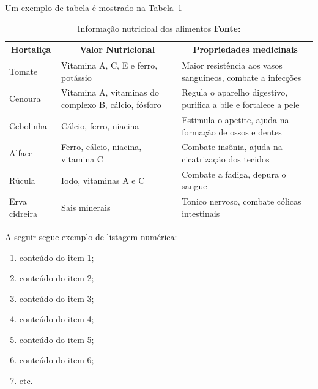 \par Um exemplo de tabela é mostrado na Tabela~\ref{tab:informativa}


\begin{table} [h]
  \caption[Informação nutricioal dos alimentos]
          {Informação nutricioal dos alimentos \textbf{Fonte:} \cite{correa2003plantas}}
  \centering
  \begin{tabular}{|p{0.7in}|p{2in}|p{3in}|}
    \hline 
    \multicolumn{1}{|c|}{\textbf{Hortaliça}} & \multicolumn{1}{c|}{\textbf{Valor Nutricional}} & \multicolumn{1}{c|}{\textbf{Propriedades medicinais}} \\
    \hline 
Tomate
&Vitamina A, C, E e ferro, potássio
&Maior resistência aos vasos sanguíneos, combate a infecções\\
    \hline 
Cenoura
&Vitamina A, vitaminas do complexo B, cálcio, fósforo
&Regula o aparelho digestivo, purifica a bile e fortalece a pele\\
    \hline
Cebolinha
&Cálcio, ferro, niacina
&Estimula o apetite, ajuda na formação de ossos e dentes\\

    \hline
Alface
&Ferro, cálcio, niacina, vita\-mina C
&Combate insônia, ajuda na cicatrização dos tecidos\\

    \hline
Rúcula
&Iodo, vitaminas A e C
&Combate a fadiga, depura o sangue\\

    \hline
Erva cidreira
&Sais minerais
&Tonico nervoso, combate cólicas intestinais\\

    \hline 
  \end{tabular}
  \label{tab:informativa}
\end{table}

\par A seguir segue exemplo de listagem numérica:

\begin{enumerate}
  \item conteúdo do item 1;
  \item conteúdo do item 2;
  \item conteúdo do item 3;
  \item conteúdo do item 4;
  \item conteúdo do item 5;
  \item conteúdo do item 6;
  \item etc.
\end{enumerate}

